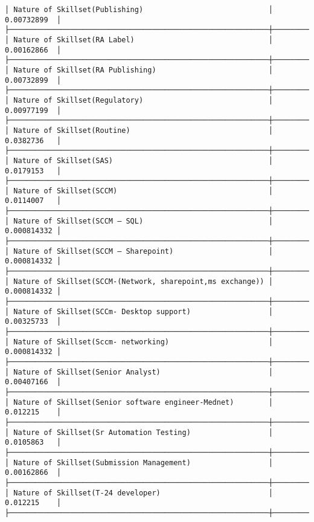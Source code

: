\documentclass[11pt]{article}
\begin{document}
\begin{Verbatim}[commandchars=\\\{\}]
│ Nature of Skillset(Publishing)                             │ 0.00732899  │
├────────────────────────────────────────────────────────────┼─────────────┤
│ Nature of Skillset(RA Label)                               │ 0.00162866  │
├────────────────────────────────────────────────────────────┼─────────────┤
│ Nature of Skillset(RA Publishing)                          │ 0.00732899  │
├────────────────────────────────────────────────────────────┼─────────────┤
│ Nature of Skillset(Regulatory)                             │ 0.00977199  │
├────────────────────────────────────────────────────────────┼─────────────┤
│ Nature of Skillset(Routine)                                │ 0.0382736   │
├────────────────────────────────────────────────────────────┼─────────────┤
│ Nature of Skillset(SAS)                                    │ 0.0179153   │
├────────────────────────────────────────────────────────────┼─────────────┤
│ Nature of Skillset(SCCM)                                   │ 0.0114007   │
├────────────────────────────────────────────────────────────┼─────────────┤
│ Nature of Skillset(SCCM – SQL)                             │ 0.000814332 │
├────────────────────────────────────────────────────────────┼─────────────┤
│ Nature of Skillset(SCCM – Sharepoint)                      │ 0.000814332 │
├────────────────────────────────────────────────────────────┼─────────────┤
│ Nature of Skillset(SCCM-(Network, sharepoint,ms exchange)) │ 0.000814332 │
├────────────────────────────────────────────────────────────┼─────────────┤
│ Nature of Skillset(SCCm- Desktop support)                  │ 0.00325733  │
├────────────────────────────────────────────────────────────┼─────────────┤
│ Nature of Skillset(Sccm- networking)                       │ 0.000814332 │
├────────────────────────────────────────────────────────────┼─────────────┤
│ Nature of Skillset(Senior Analyst)                         │ 0.00407166  │
├────────────────────────────────────────────────────────────┼─────────────┤
│ Nature of Skillset(Senior software engineer-Mednet)        │ 0.012215    │
├────────────────────────────────────────────────────────────┼─────────────┤
│ Nature of Skillset(Sr Automation Testing)                  │ 0.0105863   │
├────────────────────────────────────────────────────────────┼─────────────┤
│ Nature of Skillset(Submission Management)                  │ 0.00162866  │
├────────────────────────────────────────────────────────────┼─────────────┤
│ Nature of Skillset(T-24 developer)                         │ 0.012215    │
├────────────────────────────────────────────────────────────┼─────────────┤

\end{Verbatim}
\end{document}
